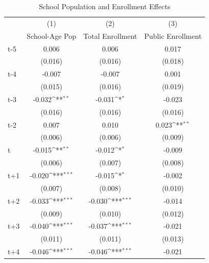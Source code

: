 \begin{table}[htbp]\centering
\def\sym#1{\ifmmode^{#1}\else\(^{#1}\)\fi}
\caption{School Population and Enrollment Effects}
\begin{tabular}{l*{3}{c}}
\hline\hline
            &\multicolumn{1}{c}{(1)}&\multicolumn{1}{c}{(2)}&\multicolumn{1}{c}{(3)}\\
            &\multicolumn{1}{c}{School-Age Pop}&\multicolumn{1}{c}{Total Enrollment}&\multicolumn{1}{c}{Public Enrollment}\\
\hline
t-5         &       0.006         &       0.006         &       0.017         \\
            &     (0.016)         &     (0.016)         &     (0.018)         \\
[1em]
t-4         &      -0.007         &      -0.007         &       0.001         \\
            &     (0.015)         &     (0.016)         &     (0.019)         \\
[1em]
t-3         &      -0.032\sym{**} &      -0.031\sym{*}  &      -0.023         \\
            &     (0.016)         &     (0.016)         &     (0.016)         \\
[1em]
t-2         &       0.007         &       0.010         &       0.023\sym{**} \\
            &     (0.006)         &     (0.006)         &     (0.009)         \\
[1em]
t           &      -0.015\sym{**} &      -0.012\sym{*}  &      -0.009         \\
            &     (0.006)         &     (0.007)         &     (0.008)         \\
[1em]
t+1         &      -0.020\sym{***}&      -0.015\sym{*}  &      -0.002         \\
            &     (0.007)         &     (0.008)         &     (0.010)         \\
[1em]
t+2         &      -0.033\sym{***}&      -0.030\sym{***}&      -0.014         \\
            &     (0.009)         &     (0.010)         &     (0.012)         \\
[1em]
t+3         &      -0.040\sym{***}&      -0.037\sym{***}&      -0.021         \\
            &     (0.011)         &     (0.011)         &     (0.013)         \\
[1em]
t+4         &      -0.046\sym{***}&      -0.046\sym{***}&      -0.021         \\

\end{tabular}
\end{table}
